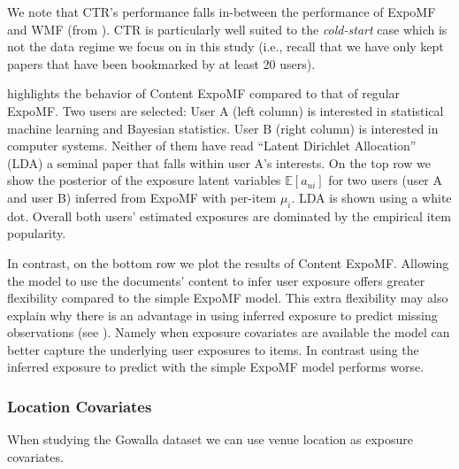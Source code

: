 We note that CTR's performance falls in-between the performance of ExpoMF
and WMF (from ). CTR is particularly well suited to the
\emph{cold-start} case which is not the data regime we focus on in this
study (i.e., recall that we have only kept papers that have been
bookmarked by at least 20 users).



 highlights the behavior of Content ExpoMF compared to that
of regular ExpoMF. Two users are selected: User A (left column) is
interested in statistical machine learning and Bayesian statistics. User B
(right column) is interested in computer systems. Neither of them have
read ``Latent Dirichlet Allocation'' (LDA) a seminal paper that falls within user A's
interests. On the top row we show the posterior of the exposure
latent variables $\mathbb{E}[a_{ui}]$ for two users (user A and user B)
inferred from ExpoMF with per-item $\mu_i$. LDA is shown using a white dot.
Overall both users' estimated exposures are dominated by the empirical item
popularity. 

In contrast, on the bottom row we plot the results of Content ExpoMF.
Allowing the model to use the documents' content to infer user exposure
offers greater flexibility compared to the simple ExpoMF model. 
This extra flexibility may also explain why there is an advantage in using
inferred exposure to predict missing observations (see ).
Namely when exposure covariates are available the model can better capture the
underlying user exposures to items. In contrast using the inferred exposure to
predict with the simple ExpoMF model performs worse.

\subsubsection*{Location Covariates}
\label{sec:si_location}

When studying the Gowalla dataset we can use venue location as exposure covariates.


